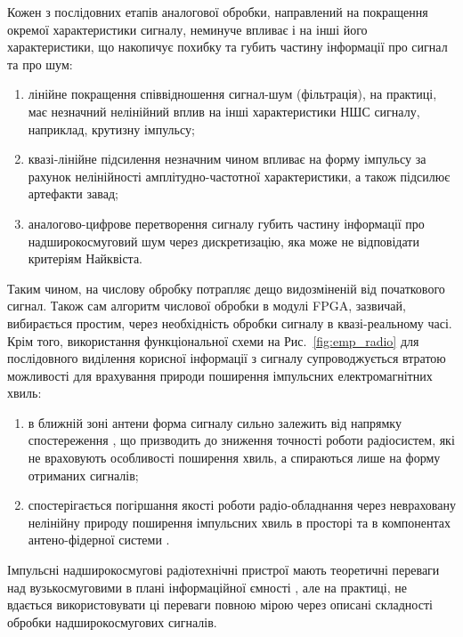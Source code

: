 Кожен з послідовних етапів аналогової обробки, направлений на покращення 
окремої характеристики сигналу, неминуче впливає і на інші його 
характеристики, що накопичує похибку та губить частину інформації про 
сигнал та про шум:

\begin{enumerate}
	\item лінійне покращення співвідношення сигнал-шум (фільтрація), 
	на практиці, має незначний нелінійний вплив на інші характеристики НШС 
	сигналу, наприклад, крутизну імпульсу;
	\item квазі-лінійне підсилення незначним чином впливає на 
	форму імпульсу за рахунок нелінійності амплітудно-частотної 
	характеристики, а також підсилює артефакти завад;
	\item аналогово-цифрове перетворення сигналу губить частину інформації 
	про надширокосмуговий шум через дискретизацію, яка може не відповідати 
	критеріям Найквіста.
\end{enumerate}

Таким чином, на числову обробку потрапляє дещо видозміненій від початкового
сигнал. Також сам алгоритм числової обробки в модулі FPGA, зазвичай,
вибирається простим, через необхідність обробки сигналу в квазі-реальному 
часі. Крім того, використання функціональної схеми на Рис.~\ref{fig:emp_radio} 
для послідовного виділення корисної інформації з сигналу супроводжується
втратою можливості для врахування природи поширення імпульсних 
електромагнітних хвиль:

\begin{enumerate}
	\item в ближній зоні антени форма сигналу сильно залежить від 
	напрямку спостереження \cite{imp:Wu1985, imp:Sodin1992-10, 
	my:Telecom2018}, що призводить до зниження точності роботи радіосистем, 
	які не враховують особливості поширення хвиль, а спираються лише на 
	форму отриманих сигналів;
	\item спостерігається погіршання якості роботи радіо-обладнання через 
	невраховану нелінійну природу поширення імпульсних хвиль в просторі та в 
	компонентах антено-фідерної системи \cite{imp:Butrim2004}.
\end{enumerate}

Імпульсні надширокосмугові радіотехнічні пристрої мають теоретичні 
переваги над вузькосмуговими в плані інформаційної ємності 
\cite{imp:ChannelLimitations}, але на практиці, не вдається використовувати 
ці переваги повною мірою через описані складності обробки надширокосмугових 
сигналів.

